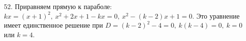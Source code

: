 52. Приравняем прямую к параболе: $kx=(x+1)^2,\ x^2+2x+1-kx=0,\ x^2-(k-2)x+1=0.$ Это уравнение имеет единственное решение при $D=(k-2)^2-4=0,\ k(k-4)=0,\ k=0$ или $k=4.$\\
